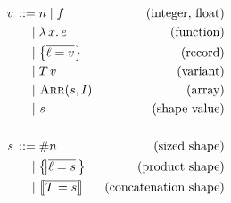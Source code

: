 \begin{align*}
\graintro v
n \mid f   
& \text{(integer, float)}
\graitem
\slam{x}{e} 
& \text{(function)}
\graitem
\srecordval{\overline{\ell = v}} 
& \text{(record)} 
\graitem
\stag{T}{v} & \text{(variant)} \\ \mid&\,\,
\sarrayval{\vess}{I} & \text{(array)} \\ \mid&\,\,
\vess & \text{(shape value)} 
\\ \\
\graintro{\vess}
\ssize{n} 
& \text{(sized shape)}
\graitem
\sproductval{\overline{ \ell = \vess }} 
& \text{(product shape)}
\graitem
\sconcatval{\overline{ T = \vess }} 
& \text{(concatenation shape)}
\end{align*}